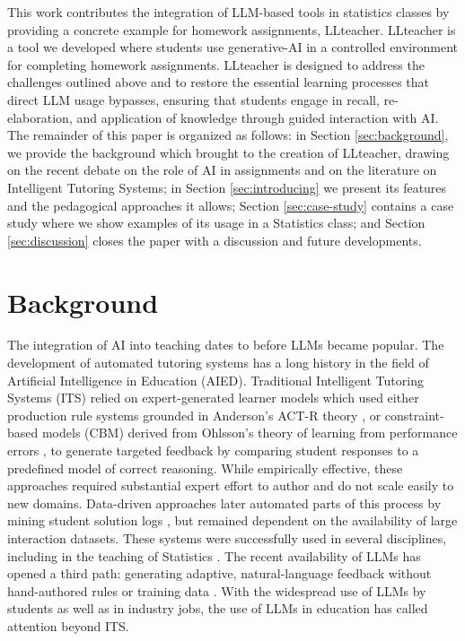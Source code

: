 \documentclass[
  12pt]{article}
\begin{document}
This work contributes the integration of LLM-based tools in statistics classes by providing a concrete example for homework assignments, LLteacher. 
LLteacher is a tool we developed where students use generative-AI in a controlled environment for completing homework assignments. 
LLteacher is designed to address the challenges outlined above and to restore the essential learning processes that direct LLM usage bypasses, ensuring that students engage in recall, re-elaboration, and application of knowledge through guided interaction with AI. 
The remainder of this paper is organized as follows: in Section \ref{sec:background}, we provide the background which brought to the creation of LLteacher, drawing on the recent debate on the role of AI in assignments and on the literature on Intelligent Tutoring Systems; in Section \ref{sec:introducing} we present its features and the pedagogical approaches it allows; 
Section \ref{sec:case-study} contains a case study where we show examples of its usage in a Statistics class; and Section \ref{sec:discussion} closes the paper with a discussion and future developments.


\section{Background \label{sec:background}}

The integration of AI into teaching dates to before LLMs became popular. 
The development of automated tutoring systems has a long history in the field of
Artificial Intelligence in Education (AIED). Traditional Intelligent Tutoring Systems
(ITS) relied on expert-generated learner models which used either production rule systems grounded
in Anderson's ACT-R theory \citep{anderson1996act}, or constraint-based models (CBM)
derived from Ohlsson's theory of learning from performance errors
\citep{ohlsson1996learning}, to generate targeted feedback by comparing student responses
to a predefined model of correct reasoning. 
While empirically effective, these approaches required substantial expert effort to author and do not scale easily to new domains.
Data-driven approaches later automated parts of this process by mining student solution
logs \citep{stamper2008hint}, but remained dependent on the availability of large
interaction datasets.
These systems were successfully used in several disciplines, including in the teaching of Statistics \citep{hobert-berens-2024}. 
The recent availability of LLMs has opened a third path: generating
adaptive, natural-language feedback without hand-authored rules or training data
\citep{stamper2024enhancing}.
With the widespread use of LLMs by students as well as in industry jobs, the use of LLMs in education has called attention beyond ITS. 
\end{document}
